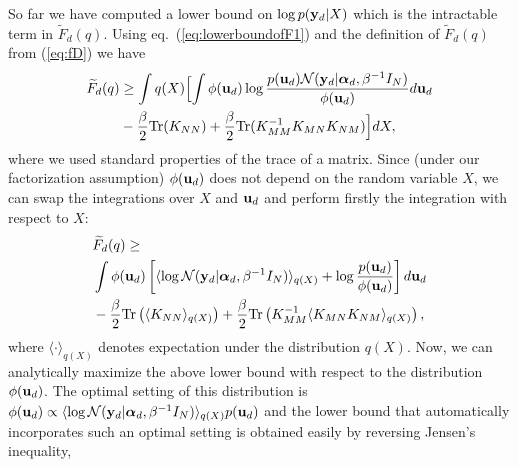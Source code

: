 \documentclass[twoside,times]{article}
\begin{document}
So far we have computed a lower bound on $\log p(\mathbf{y}_d | X)$ which is
the intractable term in $\widetilde{F}_d (q)$. Using eq.\ 
(\ref{eq:lowerboundofF1}) and the definition of $\widetilde{F}_d (q)$
from (\ref{eq:fD}) we have
%
\begin{align*}
\widetilde{F}_d(q) & \geq 
\int q(X) \Bigl[  \int \phi(\mathbf{u}_d)
\log \frac{p(\mathbf{u}_d) \mathcal{N}(\mathbf{y}_d|\boldsymbol{\alpha}_d, \beta^{-1} I_N)}
{\phi(\mathbf{u}_d)} d \mathbf{u}_d \Bigl. \nonumber \\ 
& \Bigr. - \frac{\beta}{2} \text{Tr} (K_{NN})  +  \frac{\beta}{2} \text{Tr} (K_{MM}^{-1}
K_{MN} K_{NM})  \Bigr] d X,   
\end{align*}
where we used standard properties of the  trace of a matrix.
Since (under our factorization assumption) $\phi(\mathbf{u}_d)$ does not
depend on the random variable $X$, we can swap the integrations over
$X$ and $\mathbf{u}_d$ and perform firstly the integration with respect to
$X$:
\begin{align*} 
& \widetilde{F}_d(q)  \geq \\
& \int \phi(\mathbf{u}_d)  \left[
 \langle \log \mathcal{N}(\mathbf{y}_d| \boldsymbol{\alpha}_d, \beta^{-1} I_N) \rangle_{q(X)} + 
  \log \frac{p(\mathbf{u}_d)}{\phi(\mathbf{u}_d)} 
\right] d \mathbf{u}_d \\ 
& -  
 \frac{\beta}{2} \text{Tr} \left( \langle K_{NN} \rangle_{q(X)} \right)
+ \frac{\beta}{2} \text{Tr} \left( K_{MM}^{-1} \langle K_{MN}
K_{NM} \rangle_{q(X)} \right),    
\end{align*}
where $\langle \cdot \rangle_{q(X)}$ denotes expectation under the
distribution $q(X)$.  Now, we can analytically
maximize the above lower bound with respect to the distribution
$\phi(\mathbf{u}_d)$. The optimal setting of this distribution is 
$\phi (\mathbf{u}_d) \propto \langle \log \mathcal{N}(\mathbf{y}_d| \boldsymbol{\alpha}_d, \beta^{-1} I_N)
\rangle_{q(X)} p(\mathbf{u}_d)$ and the lower bound that automatically incorporates
such an optimal setting is obtained easily by reversing Jensen's inequality,
\end{document}
